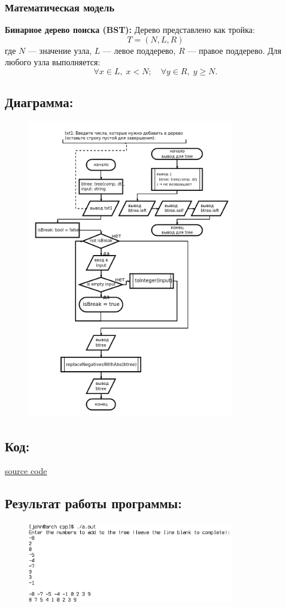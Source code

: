\documentclass[a4paper,12pt]{article}
\begin{document}
\subsubsection{Математическая модель}
\textbf{Бинарное дерево поиска (BST):} Дерево представлено как тройка:
\[ T = (N, L, R) \]
где \(N\) — значение узла, \(L\) — левое поддерево, \(R\) — правое поддерево. Для любого узла выполняется:
\[ \forall x \in L, \; x < N; \quad \forall y \in R, \; y \geq N. \]
\subsection{Диаграмма:}
\begin{figure}[h]
\centering
\includegraphics[width=0.8\textwidth]{data/diagram17.png}
\end{figure}
\subsection{Код:}

\href{https://raw.githubusercontent.com/John1400800/stuff/refs/heads/main/c_learning/home_works/task17.cpp}{source code}
\subsection{Результат работы программы:}
\begin{figure}[h]
\includegraphics[width=0.8\textwidth]{data/demo17.png}
\end{figure}
\end{document}
